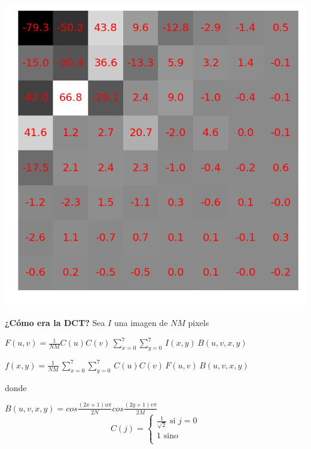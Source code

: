 \documentclass{beamer}
\begin{document}
\begin{frame}
    \includegraphics[scale=0.2]{fig/8x8random_dct.png}
\end{frame}

\begin{frame}
    \begin{center}
        \textbf{¿Cómo era la DCT?} Sea $I$ una imagen de $NM$ pixels
        \vspace{1cm}

        $F(u,v)=\frac{1}{NM}C(u)C(v)\,\sum_{x=0}^{7} \sum_{y=0}^{7}\,I(x,y)\,B(u,v,x,y)$

        \vspace{3mm}
        $f(x,y)=\frac{1}{NM}\,\sum_{x=0}^{7} \sum_{y=0}^{7}\,C(u)C(v)\,F(u,v)\,B(u,v,x,y)$

        \vspace{3mm}
        donde
        \vspace{3mm}

        $B(u,v,x,y) = cos\frac{(2x+1)u\pi}{2N}cos\frac{(2y+1)v\pi}{2M}$
        \[
        C(j) =
             \begin{cases}
                 \frac{1}{\sqrt{2}}\text{ si $j=0$}\\
                 1 \text{ sino}\\
             \end{cases}
        \]
    \end{center}
\end{frame}
\end{document}
